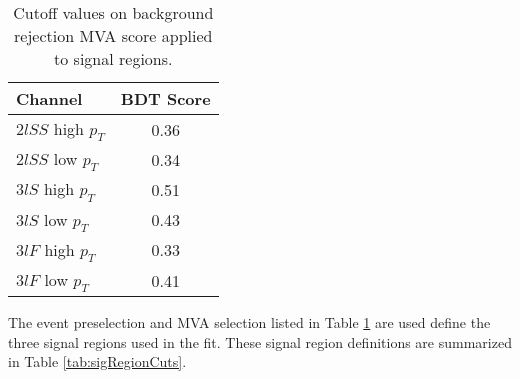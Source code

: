 \begin{table}[H]
  \begin{center}
  \begin{tabular}{|l|c|}
  \hline\hline
  Channel & BDT Score \\
  \hline
  $2lSS$ high $p_T$ & 0.36 \\
  $2lSS$ low $p_T$ & 0.34 \\
  $3lS$ high $p_T$ & 0.51 \\
  $3lS$ low $p_T$ & 0.43 \\
  $3lF$ high $p_T$ & 0.33 \\
  $3lF$ low $p_T$ & 0.41 \\
  \hline
  \end{tabular}
  \end{center}
  \caption{Cutoff values on background rejection MVA score applied to signal regions.}
  \label{tab:sigBkgCuts}
\end{table}

The event preselection and MVA selection listed in Table \ref{tab:sigBkgCuts} are used define the three signal regions used in the fit. These signal region definitions are summarized in Table \ref{tab:sigRegionCuts}.


